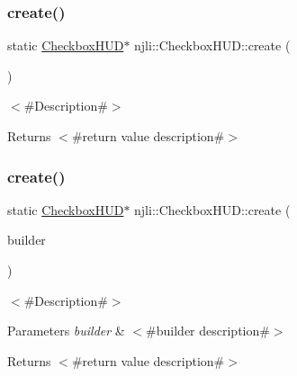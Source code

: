 \subsubsection{\texorpdfstring{create()}{create()}\hspace{0.1cm}{\footnotesize\ttfamily [2/3]}}
{\footnotesize\ttfamily static \mbox{\hyperlink{classnjli_1_1_checkbox_h_u_d}{Checkbox\+H\+UD}}$\ast$ njli\+::\+Checkbox\+H\+U\+D\+::create (\begin{DoxyParamCaption}{ }\end{DoxyParamCaption})\hspace{0.3cm}{\ttfamily [static]}}

$<$\#\+Description\#$>$

\begin{DoxyReturn}{Returns}
$<$\#return value description\#$>$ 
\end{DoxyReturn}
\mbox{\label{classnjli_1_1_checkbox_h_u_d_ac1d8b71694df11c9ea0192021d8e0d1d}} 
\subsubsection{\texorpdfstring{create()}{create()}\hspace{0.1cm}{\footnotesize\ttfamily [3/3]}}
{\footnotesize\ttfamily static \mbox{\hyperlink{classnjli_1_1_checkbox_h_u_d}{Checkbox\+H\+UD}}$\ast$ njli\+::\+Checkbox\+H\+U\+D\+::create (\begin{DoxyParamCaption}\item[{const \mbox{\hyperlink{classnjli_1_1_checkbox_h_u_d_builder}{Checkbox\+H\+U\+D\+Builder}} \&}]{builder }\end{DoxyParamCaption})\hspace{0.3cm}{\ttfamily [static]}}

$<$\#\+Description\#$>$


\begin{DoxyParams}{Parameters}
{\em builder} & $<$\#builder description\#$>$\\
\hline
\end{DoxyParams}
\begin{DoxyReturn}{Returns}
$<$\#return value description\#$>$ 
\end{DoxyReturn}
\mbox{\label{classnjli_1_1_checkbox_h_u_d_aa55de648a51d6a4b9deaeb7d1f0aecf1}} 

